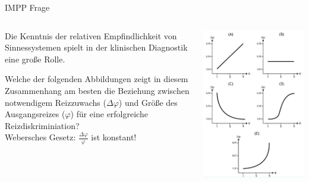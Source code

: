 \documentclass{beamer}
\begin{document}
\begin{frame}{IMPP Frage}


\begin{columns}[c]
\begin{column}{6cm}
Die Kenntnis der relativen Empfindlichkeit von Sinnessystemen spielt in der klinischen Diagnostik eine große Rolle. 

Welche der folgenden Abbildungen zeigt in diesem Zusammenhang am besten die Beziehung zwischen \textcolor{theme}{notwendigem Reizzuwachs} (\( \Delta \varphi \)) und \textcolor{theme}{Größe des Ausgangsreizes} (\(\varphi\)) für eine erfolgreiche Reizdiskriminiation? \\[0.2 cm]


\textcolor{theme}{Webersches Gesetz: \(\frac{\Delta \varphi}{\varphi}\) ist konstant!}


\end{column}


\begin{column}{5cm}
\begin{center}
    \includegraphics[width=\textwidth]{weber_IMPP.png}
\end{center}
\end{column}

\end{columns}
    
\end{frame}
\end{document}
